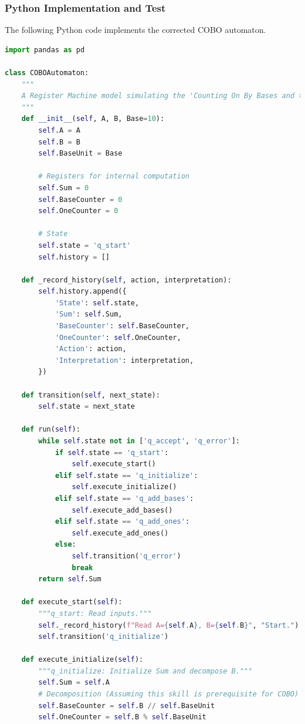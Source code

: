 \documentclass[11pt]{article}
\begin{document}
\subsubsection*{Python Implementation and Test}

The following Python code implements the corrected COBO automaton.

\begin{lstlisting}[language=Python]
import pandas as pd

class COBOAutomaton:
    """
    A Register Machine model simulating the 'Counting On By Bases and then Ones' (COBO) strategy.
    """
    def __init__(self, A, B, Base=10):
        self.A = A
        self.B = B
        self.BaseUnit = Base

        # Registers for internal computation
        self.Sum = 0
        self.BaseCounter = 0
        self.OneCounter = 0

        # State
        self.state = 'q_start'
        self.history = []

    def _record_history(self, action, interpretation):
        self.history.append({
            'State': self.state,
            'Sum': self.Sum,
            'BaseCounter': self.BaseCounter,
            'OneCounter': self.OneCounter,
            'Action': action,
            'Interpretation': interpretation,
        })

    def transition(self, next_state):
        self.state = next_state

    def run(self):
        while self.state not in ['q_accept', 'q_error']:
            if self.state == 'q_start':
                self.execute_start()
            elif self.state == 'q_initialize':
                self.execute_initialize()
            elif self.state == 'q_add_bases':
                self.execute_add_bases()
            elif self.state == 'q_add_ones':
                self.execute_add_ones()
            else:
                self.transition('q_error')
                break
        return self.Sum

    def execute_start(self):
        """q_start: Read inputs."""
        self._record_history(f"Read A={self.A}, B={self.B}", "Start.")
        self.transition('q_initialize')

    def execute_initialize(self):
        """q_initialize: Initialize Sum and decompose B."""
        self.Sum = self.A
        # Decomposition (Assuming this skill is prerequisite for COBO)
        self.BaseCounter = self.B // self.BaseUnit
        self.OneCounter = self.B % self.BaseUnit


\end{lstlisting}
\end{document}
